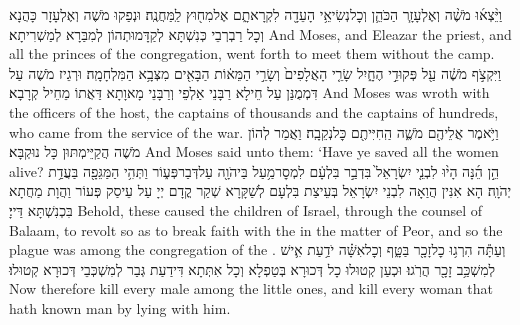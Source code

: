 {וַיֵּ֨צְא֜וּ מֹשֶׁ֨ה וְאֶלְעָזָ֧ר הַכֹּהֵ֛ן וְכׇל\maqqaf נְשִׂיאֵ֥י הָעֵדָ֖ה לִקְרָאתָ֑ם אֶל\maqqaf מִח֖וּץ לַֽמַּחֲנֶֽה׃}
{וּנְפַקוּ מֹשֶׁה וְאֶלְעָזָר כָּהֲנָא וְכָל רַבְרְבֵי כְּנִשְׁתָּא לְקַדָּמוּתְהוֹן לְמִבַּרָא לְמַשְׁרִיתָא׃}
{And Moses, and Eleazar the priest, and all the princes of the congregation, went forth to meet them without the camp.}{}
{וַיִּקְצֹ֣ף מֹשֶׁ֔ה עַ֖ל פְּקוּדֵ֣י הֶחָ֑יִל שָׂרֵ֤י הָאֲלָפִים֙ וְשָׂרֵ֣י הַמֵּא֔וֹת הַבָּאִ֖ים מִצְּבָ֥א הַמִּלְחָמָֽה׃}
{וּרְגֵיז מֹשֶׁה עַל דִּמְמֻנַּן עַל חֵילָא רַבָּנֵי אַלְפֵי וְרַבָּנֵי מָאוָתָא דַּאֲתוֹ מֵחֵיל קְרָבָא׃}
{And Moses was wroth with the officers of the host, the captains of thousands and the captains of hundreds, who came from the service of the war.}{}
{וַיֹּ֥אמֶר אֲלֵיהֶ֖ם מֹשֶׁ֑ה הַֽחִיִּיתֶ֖ם כׇּל\maqqaf נְקֵבָֽה׃}
{וַאֲמַר לְהוֹן מֹשֶׁה הֲקַיֵּימְתּוּן כָּל נוּקְבָּא׃}
{And Moses said unto them: ‘Have ye saved all the women alive?}{}
{הֵ֣ן הֵ֜נָּה הָי֨וּ לִבְנֵ֤י יִשְׂרָאֵל֙ בִּדְבַ֣ר בִּלְעָ֔ם לִמְסׇר\maqqaf מַ֥עַל בַּיהֹוָ֖ה עַל\maqqaf דְּבַר\maqqaf פְּע֑וֹר וַתְּהִ֥י הַמַּגֵּפָ֖ה בַּעֲדַ֥ת יְהֹוָֽה׃}
{הָא אִנִּין הֲוַאָה לִבְנֵי יִשְׂרָאֵל בְּעֵיצַת בִּלְעָם לְשַׁקָּרָא שְׁקַר קֳדָם יְיָ עַל עֵיסַק פְּעוֹר וַהֲוָת מַחֲתָא בִּכְנִשְׁתָּא דַּייָ׃}
{Behold, these caused the children of Israel, through the counsel of Balaam, to revolt so as to break faith with the \lord\space in the matter of Peor, and so the plague was among the congregation of the \lord.}{}
{וְעַתָּ֕ה הִרְג֥וּ כׇל\maqqaf זָכָ֖ר בַּטָּ֑ף וְכׇל\maqqaf אִשָּׁ֗ה יֹדַ֥עַת אִ֛ישׁ לְמִשְׁכַּ֥ב זָכָ֖ר הֲרֹֽגוּ׃}
{וּכְעַן קְטוּלוּ כָל דְּכוּרָא בְּטַפְלָא וְכָל אִתְּתָא דִּידַעַת גְּבַר לְמִשְׁכְּבֵי דְּכוּרָא קְטוּלוּ׃}
{Now therefore kill every male among the little ones, and kill every woman that hath known man by lying with him.}{}
